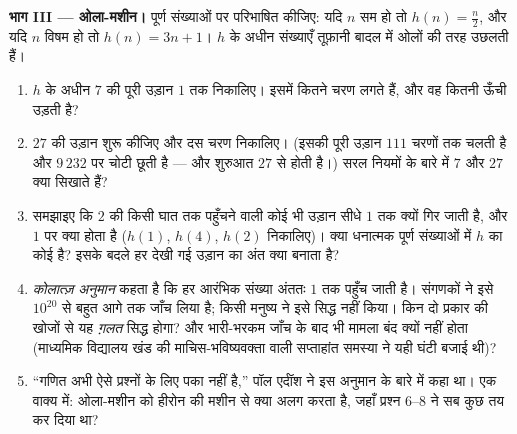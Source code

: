 \begin{problem}
\medskip
\noindent\textbf{भाग III --- ओला-मशीन।}
पूर्ण संख्याओं पर परिभाषित कीजिए: यदि $n$ सम हो तो $h(n) = \frac n2$, और यदि $n$
विषम हो तो $h(n) = 3n + 1$। $h$ के अधीन संख्याएँ तूफ़ानी बादल में ओलों की तरह उछलती
हैं।
\begin{enumerate}[resume]
  \item $h$ के अधीन $7$ की पूरी उड़ान $1$ तक निकालिए। इसमें कितने
        चरण लगते हैं, और वह कितनी ऊँची उड़ती है?
  \item $27$ की उड़ान शुरू कीजिए और दस चरण निकालिए। (इसकी पूरी उड़ान $111$
        चरणों तक चलती है और $9\,232$ पर चोटी छूती है --- और शुरुआत $27$ से
        होती है।) सरल नियमों के बारे में $7$ और $27$ क्या सिखाते हैं?
  \item समझाइए कि $2$ की किसी घात तक पहुँचने वाली कोई भी उड़ान सीधे $1$
        तक क्यों गिर जाती है, और $1$ पर क्या होता है ($h(1)$, $h(4)$, $h(2)$
        निकालिए)। क्या धनात्मक पूर्ण संख्याओं में $h$ का कोई 
        है? इसके बदले हर देखी गई उड़ान का अंत क्या बनाता है?
  \item \emph{कोलात्ज़ अनुमान} कहता है कि हर आरंभिक संख्या अंततः $1$ तक
        पहुँच जाती है। संगणकों ने इसे $10^{20}$ से बहुत आगे तक जाँच लिया है;
        किसी मनुष्य ने इसे सिद्ध नहीं किया। किन दो प्रकार की खोजों से यह
        \emph{ग़लत} सिद्ध होगा? और भारी-भरकम जाँच के बाद भी मामला बंद क्यों
        नहीं होता (माध्यमिक विद्यालय खंड की माचिस-भविष्यवक्ता वाली
        सप्ताहांत समस्या ने यही घंटी बजाई थी)?
  \item ``गणित अभी ऐसे प्रश्नों के लिए पका नहीं है,'' पॉल एर्दॉश ने इस
        अनुमान के बारे में कहा था। एक वाक्य में: ओला-मशीन को हीरोन की मशीन
        से क्या अलग करता है, जहाँ प्रश्न 6--8 ने सब कुछ तय कर दिया था?
\end{enumerate}


\end{problem}
